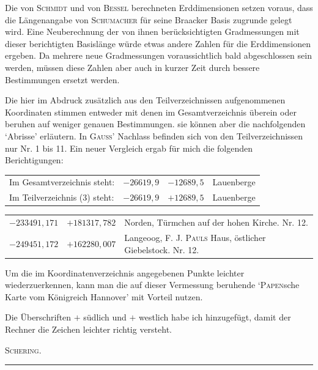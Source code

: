 Die von \textsc{Schmidt} und von \textsc{Bessel} berechneten Erddimensionen setzen voraus, dass die Längenangabe von \textsc{Schumacher} für seine Braacker Basis zugrunde gelegt wird. Eine Neuberechnung der von ihnen berücksichtigten Gradmessungen mit dieser berichtigten Basislänge würde etwas andere Zahlen für die Erddimensionen ergeben. Da mehrere neue Gradmessungen voraussichtlich bald abgeschlossen sein werden, müssen diese Zahlen aber auch in kurzer Zeit durch bessere Bestimmungen ersetzt werden.

Die hier im Abdruck zusätzlich aus den Teilverzeichnissen aufgenommenen Koordinaten stimmen entweder mit denen im Gesamtverzeichnis überein oder beruhen auf weniger genauen Bestimmungen. sie können aber die nachfolgenden ‘Abrisse’ erläutern. In \textsc{Gauss}’ Nachlass befinden sich von den Teilverzeichnissen nur Nr. 1 bis 11. Ein neuer Vergleich ergab für mich die folgenden Berichtigungen:
\begin{center}\small\begin{tabular}{@{}p{.39\linewidth}rrp{.16\linewidth}@{}}
Im Gesamtverzeichnis steht:&\(-26619{,}9\)&\(-12689{,}5\)&Lauenberge\\
Im Teilverzeichnis (3) steht:&\(-26619{,}9\)&\(+12689{,}5\)&Lauenberge
\end{tabular}\end{center}
\begin{center}\begin{tabular}{@{}rrp{.55\linewidth}@{}}
\(-233491{,}171\)&\(+181317{,}782\)&Norden, Türmchen auf der hohen Kirche. Nr. 12.\\
\(-249451{,}172\)&\(+162280{,}007\)&Langeoog, F. J. \textsc{Pauls} Haus, östlicher Giebelstock. Nr. 12.
\end{tabular}\end{center}

Um die im Koordinatenverzeichnis angegebenen Punkte leichter wiederzuerkennen, kann man die auf dieser Vermessung beruhende ‘\textsc{Papen}sche Karte vom Königreich Hannover’ mit Vorteil nutzen.

Die Überschriften \(+\) südlich und \(+\) westlich habe ich hinzugefügt, damit der Rechner die Zeichen leichter richtig versteht.
\begin{flushright}\textsc{Schering.}\end{flushright}
\begin{center}\rule{.23\linewidth}{.3pt}\end{center}
